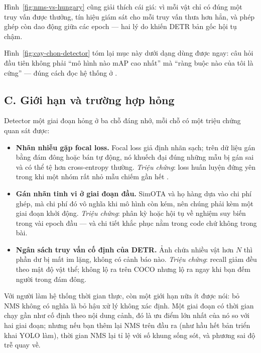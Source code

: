 \documentclass[../../../deep_learning.tex]{subfiles}
\begin{document}
Hình~\ref{fig:nms-vs-hungary} cũng giải thích cái giá: vì mỗi vật chỉ có đúng một truy vấn được thưởng, tín hiệu giám sát cho mỗi truy vấn thưa hơn hẳn, và phép ghép còn dao động giữa các epoch --- hai lý do khiến DETR bản gốc hội tụ chậm.

Hình~\ref{fig:cay-chon-detector} tóm lại mục này dưới dạng dùng được ngay: câu hỏi đầu tiên không phải ``mô hình nào mAP cao nhất'' mà ``ràng buộc nào của tôi là cứng'' --- đúng cách đọc hệ thống ở .

\subsection{C. Giới hạn và trường hợp hỏng}
Detector một giai đoạn hỏng ở ba chỗ đáng nhớ, mỗi chỗ có một triệu chứng quan sát được:

\begin{itemize}
\item \textbf{Nhãn nhiễu gặp focal loss.} Focal loss giả định nhãn sạch; trên dữ liệu gán bằng đám đông hoặc bán tự động, nó khuếch đại đúng những mẫu bị gán sai và có thể tệ hơn cross-entropy thường. \emph{Triệu chứng}: loss huấn luyện đứng yên trong khi một nhóm rất nhỏ mẫu chiếm gần hết .
\item \textbf{Gán nhãn tinh vi ở giai đoạn đầu.} SimOTA và họ hàng dựa vào chi phí ghép, mà chi phí đó vô nghĩa khi mô hình còn kém, nên chúng phải kèm một giai đoạn khởi động. \emph{Triệu chứng}: phân kỳ hoặc hội tụ về nghiệm suy biến trong vài epoch đầu --- và chi tiết khắc phục nằm trong code chứ không trong bài.
\item \textbf{Ngân sách truy vấn cố định của DETR.} Ảnh chứa nhiều vật hơn \(N\) thì phần dư bị mất im lặng, không có cảnh báo nào. \emph{Triệu chứng}: recall giảm đều theo mật độ vật thể; không lộ ra trên COCO nhưng lộ ra ngay khi bạn đếm người trong đám đông.
\end{itemize}

Với người làm hệ thống thời gian thực, còn một giới hạn nữa ít được nói: bỏ NMS không có nghĩa là bỏ hậu xử lý không xác định. Một giai đoạn có thời gian chạy gần như cố định theo nội dung cảnh, đó là ưu điểm lớn nhất của nó so với hai giai đoạn; nhưng nếu bạn thêm lại NMS trên đầu ra (như hầu hết bản triển khai YOLO làm), thời gian NMS lại tỉ lệ với số khung sống sót, và phương sai độ trễ quay về.
\end{document}
